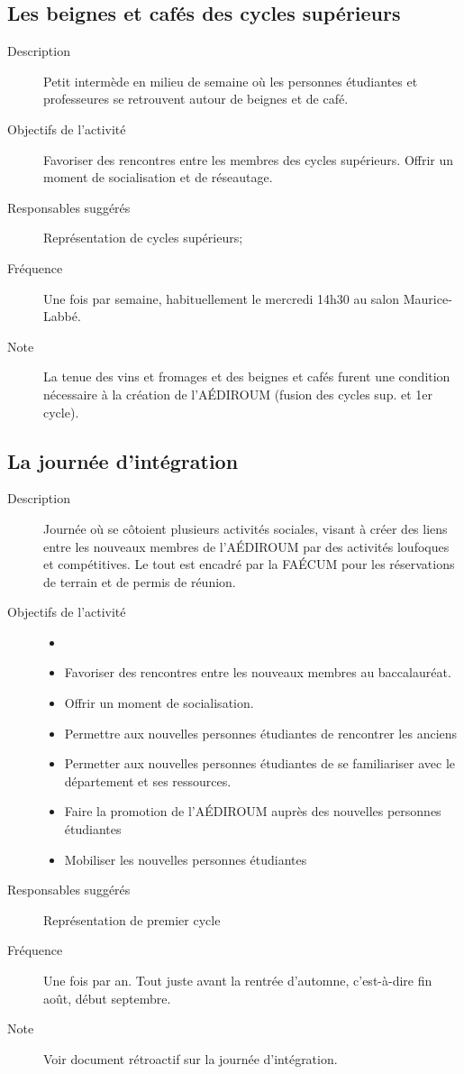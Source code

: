 \documentclass{aediroum}
\begin{document}
\subsection{Les beignes et cafés des cycles supérieurs}
\begin{description}
	\item[Description] Petit intermède en milieu de semaine où les personnes étudiantes et professeures se retrouvent autour de beignes et de café.
	\item[Objectifs de l'activité] Favoriser des rencontres entre les membres des cycles supérieurs. Offrir un moment de socialisation et de réseautage.
	\item[Responsables suggérés] Représentation de cycles supérieurs;
	\item[Fréquence] Une fois par semaine, habituellement le mercredi 14h30 au salon Maurice-Labbé.
	\item[Note] La tenue des vins et fromages et des beignes et cafés furent une condition nécessaire à la création de l'AÉDIROUM (fusion des cycles sup. et 1er cycle).
\end{description}

\subsection{La journée d'intégration}
\begin{description}
	\item[Description] Journée où se côtoient plusieurs activités sociales, visant à créer des liens entre les nouveaux membres de l'AÉDIROUM par des activités loufoques et compétitives. Le tout est encadré par la FAÉCUM pour les réservations de terrain et de permis de réunion.
	\item[Objectifs de l'activité]
	\begin{itemize}
		\item[]
		\item Favoriser des rencontres entre les nouveaux membres au baccalauréat.
		\item Offrir un moment de socialisation.
		\item Permettre aux nouvelles personnes étudiantes de rencontrer les anciens
		\item Permetter aux nouvelles personnes étudiantes de se familiariser avec le département et ses ressources.
		\item Faire la promotion de l'AÉDIROUM auprès des nouvelles personnes étudiantes
		\item Mobiliser les nouvelles personnes étudiantes
	\end{itemize}
	\item[Responsables suggérés] Représentation de premier cycle
	\item[Fréquence] Une fois par an. Tout juste avant la rentrée d'automne, c'est-à-dire fin août, début septembre.
	\item[Note] Voir document rétroactif sur la journée d'intégration.
\end{description}
\end{document}
